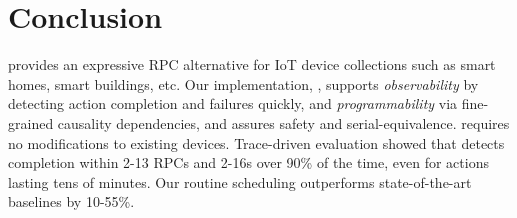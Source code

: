 \section{Conclusion}

\abs{} provides an expressive RPC alternative for IoT device collections such as smart homes, smart buildings, etc. Our implementation, \sysname, supports \textit{observability} by detecting action completion and failures quickly, and \textit{programmability} via fine-grained causality dependencies, and assures safety and serial-equivalence. \sysname{} requires no modifications to existing devices. 
Trace-driven evaluation showed that \sysname{} detects completion within 2-13 RPCs and 2-16s over 90\% of the time,
even for actions lasting tens of minutes.  Our
routine scheduling outperforms state-of-the-art baselines by 10-55\%. 
